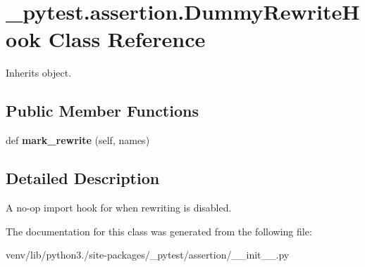 \hypertarget{class__pytest_1_1assertion_1_1_dummy_rewrite_hook}{}\section{\+\_\+pytest.\+assertion.\+Dummy\+Rewrite\+Hook Class Reference}
\label{class__pytest_1_1assertion_1_1_dummy_rewrite_hook}


Inherits object.

\subsection*{Public Member Functions}
\begin{DoxyCompactItemize}
\item 
\mbox{\label{class__pytest_1_1assertion_1_1_dummy_rewrite_hook_a14cd95af4b696ab71d3d531392e4f62d}} 
def {\bfseries mark\+\_\+rewrite} (self, names)
\end{DoxyCompactItemize}


\subsection{Detailed Description}
\begin{DoxyVerb}A no-op import hook for when rewriting is disabled.\end{DoxyVerb}
 

The documentation for this class was generated from the following file\+:\begin{DoxyCompactItemize}
\item 
venv/lib/python3./site-\/packages/\+\_\+pytest/assertion/\+\_\+\+\_\+init\+\_\+\+\_\+.\+py\end{DoxyCompactItemize}
